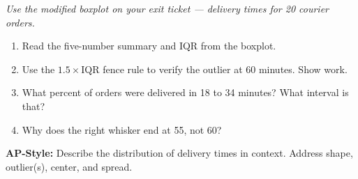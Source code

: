\documentclass[aspectratio=169, 11pt]{beamer}
\begin{document}
{
\begin{frame}[t, plain]
  \vspace{0.8em}%
  \hspace{0.55cm}%
  \begin{minipage}{0.9\textwidth}
    \small
    \textit{Use the modified boxplot on your exit ticket --- delivery times for
    20 courier orders.}

    \vspace{0.5em}
    \begin{enumerate}\setlength{\itemsep}{0.5em}
      \item Read the five-number summary and IQR from the boxplot.
      \item Use the $1.5\times\text{IQR}$ fence rule to verify the outlier at
            60 minutes. Show work.
      \item What percent of orders were delivered in 18 to 34 minutes? What
            interval is that?
      \item Why does the right whisker end at 55, not 60?
    \end{enumerate}

    \vspace{0.4em}
    \textbf{AP-Style:} Describe the distribution of delivery times in context.
    Address shape, outlier(s), center, and spread.
  \end{minipage}
\end{frame}
}
\end{document}

